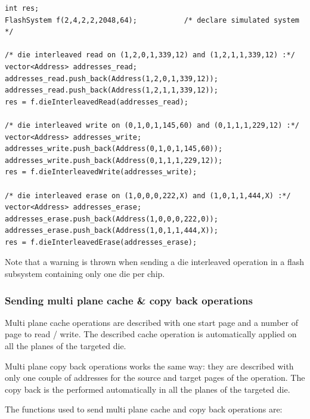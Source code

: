 \begin{lstlisting}
int res;
FlashSystem f(2,4,2,2,2048,64);           /* declare simulated system */

/* die interleaved read on (1,2,0,1,339,12) and (1,2,1,1,339,12) :*/
vector<Address> addresses_read;
addresses_read.push_back(Address(1,2,0,1,339,12)); 
addresses_read.push_back(Address(1,2,1,1,339,12));
res = f.dieInterleavedRead(addresses_read);

/* die interleaved write on (0,1,0,1,145,60) and (0,1,1,1,229,12) :*/
vector<Address> addresses_write;
addresses_write.push_back(Address(0,1,0,1,145,60)); 
addresses_write.push_back(Address(0,1,1,1,229,12));
res = f.dieInterleavedWrite(addresses_write);

/* die interleaved erase on (1,0,0,0,222,X) and (1,0,1,1,444,X) :*/
vector<Address> addresses_erase;
addresses_erase.push_back(Address(1,0,0,0,222,0)); 
addresses_erase.push_back(Address(1,0,1,1,444,X));
res = f.dieInterleavedErase(addresses_erase);
\end{lstlisting}

Note that a warning is thrown when sending a die interleaved operation in a flash subsystem containing only one die per chip.

\subsubsection{Sending multi plane cache \& copy back operations}
Multi plane cache operations are described with one start page and a number of page to read / write. The described cache operation is automatically applied on all the planes of the targeted die.

Multi plane copy back operations works the same way: they are described with only one couple of addresses for the source and target pages of the operation. The copy back is the performed automatically in all the planes of the targeted die.

The functions used to send multi plane cache and copy back operations are:

